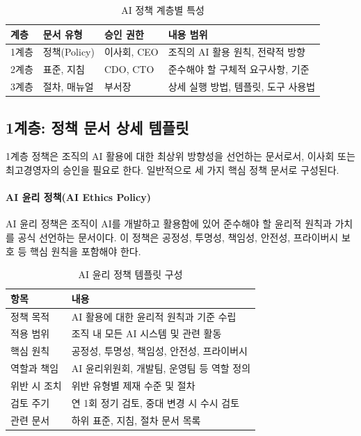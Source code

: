 \begin{table}[htbp]
\centering
\caption{AI 정책 계층별 특성}
\label{tab:policy_layers}
\begin{tabularx}{\textwidth}{p{1.5cm}p{2.5cm}p{2.5cm}X}
\toprule
\textbf{계층} & \textbf{문서 유형} & \textbf{승인 권한} & \textbf{내용 범위} \\
\midrule
1계층 & 정책(Policy) & 이사회, CEO & 조직의 AI 활용 원칙, 전략적 방향 \\
2계층 & 표준, 지침 & CDO, CTO & 준수해야 할 구체적 요구사항, 기준 \\
3계층 & 절차, 매뉴얼 & 부서장 & 상세 실행 방법, 템플릿, 도구 사용법 \\
\bottomrule
\end{tabularx}
\end{table}

\subsection{1계층: 정책 문서 상세 템플릿}
\label{sec:5.1.2}

1계층 정책은 조직의 AI 활용에 대한 최상위 방향성을 선언하는 문서로서, 이사회 또는 최고경영자의 승인을 필요로 한다. 일반적으로 세 가지 핵심 정책 문서로 구성된다.

\paragraph{AI 윤리 정책(AI Ethics Policy)}
AI 윤리 정책은 조직이 AI를 개발하고 활용함에 있어 준수해야 할 윤리적 원칙과 가치를 공식 선언하는 문서이다. 이 정책은 공정성\cite{mehrabi2021survey}, 투명성\cite{arrieta2020explainable}, 책임성, 안전성, 프라이버시 보호 등 핵심 원칙을 포함해야 한다.

\begin{table}[htbp]
\centering
\caption{AI 윤리 정책 템플릿 구성}
\label{tab:ethics_policy_template}
\begin{tabularx}{\textwidth}{p{3cm}X}
\toprule
\textbf{항목} & \textbf{내용} \\
\midrule
정책 목적 & AI 활용에 대한 윤리적 원칙과 기준 수립 \\
적용 범위 & 조직 내 모든 AI 시스템 및 관련 활동 \\
핵심 원칙 & 공정성, 투명성, 책임성, 안전성, 프라이버시 \\
역할과 책임 & AI 윤리위원회, 개발팀, 운영팀 등 역할 정의 \\
위반 시 조치 & 위반 유형별 제재 수준 및 절차 \\
검토 주기 & 연 1회 정기 검토, 중대 변경 시 수시 검토 \\
관련 문서 & 하위 표준, 지침, 절차 문서 목록 \\
\bottomrule
\end{tabularx}
\end{table}

